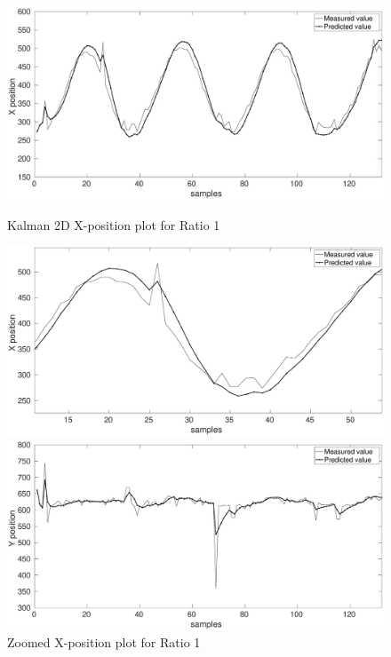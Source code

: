\documentclass[12pt]{article}
\begin{document}
\begin{figure}[ht!]
\centering
\begin{minipage}{0.5\textwidth}
\centering
	\includegraphics[width = \textwidth]{./Figures/part2Ratio1X.eps}
	\caption{Kalman 2D X-position plot for Ratio 1}
	\label{fig:kalman 2D XRat1}
\end{minipage}%
\begin{minipage}{0.5\textwidth}
\centering
	\includegraphics[width = \textwidth]{./Figures/part2Ratio1Xzoomed.eps}
	\caption{ Zoomed X-position plot for Ratio 1}
	\label{fig: kalman 2D XRat1 zoom}
\end{minipage}
\begin{minipage}{0.5\textwidth}
\centering
	\includegraphics[width = \textwidth]{./Figures/part2Ratio1Y.eps}

\end{minipage}
\end{figure}
\end{document}
